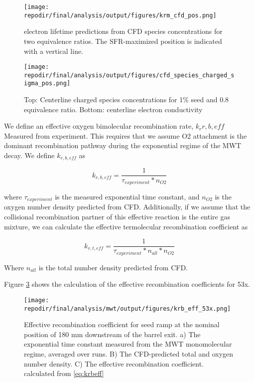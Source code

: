 \begin{figure}[h]
    \texttt{[image: \\repodir/final/analysis/output/figures/krm\_cfd\_pos.png]} 
    \caption{electron lifetime predictions from CFD species concentrations for two equivalence ratios. The SFR-maximized position is indicated with a vertical line.}
    \label{fig:SI_krm_cfd_pos}
\end{figure}


\begin{figure}[h]
    \texttt{[image: \\repodir/final/analysis/output/figures/cfd\_species\_charged\_sigma\_pos.png]} 
    \caption{Top: Centerline charged species concentrations for 1\% seed and 0.8 equivalence ratio. Bottom: centerline electron conductivity }
    \label{fig:SI_cfd_species_charged_sigma_pos}
\end{figure}



\clearpage

We define an effective oxygen bimolecular recombination rate, $k_r{r, b,eff}$ Measured from experiment. This requires that we assume O2 attachment is the dominant recombination pathway during the exponential regime of the MWT decay. We define $k_{r,b,eff}$ as 

\begin{equation}
    \label{eq:krbeff}
    k_{r,b,eff} = \frac{1}{\tau_{experiment} *  n_{O2}}
\end{equation}

where $\tau_{experiment}$ is the measured exponential time constant,  and $n_{O2}$ is the oxygen number density predicted from CFD. Additionally, if we assume that the collisional recombination partner of this effective reaction is the entire gas mixture, we can calculate the effective termolecular recombination coefficient as


\begin{equation}
    \label{eq:krteff}
    k_{r,t,eff} = \frac{1}{\tau_{experiment} * n_{all} *  n_{O2}}
\end{equation}

Where $n_{all}$ is the total number density predicted from CFD.

Figure \ref{fig:SI_krb_eff_53x} shows the calculation of the effective recombination coefficients for 53x.

\begin{figure}[]
\centering
\texttt{[image: \\repodir/final/analysis/mwt/output/figures/krb\_eff\_53x.png]}
\caption{Effective recombination coefficient for seed ramp at the nominal position of 180 mm downstream of the barrel exit. a) The exponential time constant measured from the MWT monomolecular regime, averaged over runs. B) The CFD-predicted total and oxygen number density. C) The effective recombination coefficient. calculated from \ref{eq:krbeff}}
\label{fig:SI_krb_eff_53x}
\end{figure}

